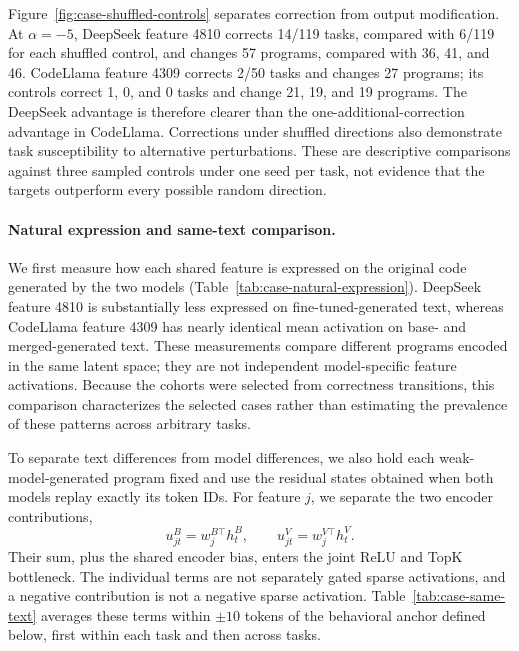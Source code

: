 Figure~\ref{fig:case-shuffled-controls} separates correction from output modification. At $\alpha=-5$, DeepSeek feature 4810 corrects 14/119 tasks, compared with 6/119 for each shuffled control, and changes 57 programs, compared with 36, 41, and 46. CodeLlama feature 4309 corrects 2/50 tasks and changes 27 programs; its controls correct 1, 0, and 0 tasks and change 21, 19, and 19 programs. The DeepSeek advantage is therefore clearer than the one-additional-correction advantage in CodeLlama. Corrections under shuffled directions also demonstrate task susceptibility to alternative perturbations. These are descriptive comparisons against three sampled controls under one seed per task, not evidence that the targets outperform every possible random direction.

\paragraph{Natural expression and same-text comparison.}
We first measure how each shared feature is expressed on the original code generated by the two models (Table~\ref{tab:case-natural-expression}). DeepSeek feature 4810 is substantially less expressed on fine-tuned-generated text, whereas CodeLlama feature 4309 has nearly identical mean activation on base- and merged-generated text. These measurements compare different programs encoded in the same latent space; they are not independent model-specific feature activations. Because the cohorts were selected from correctness transitions, this comparison characterizes the selected cases rather than estimating the prevalence of these patterns across arbitrary tasks.



To separate text differences from model differences, we also hold each weak-model-generated program fixed and use the residual states obtained when both models replay exactly its token IDs. For feature $j$, we separate the two encoder contributions,
\[
 u_{jt}^{B}=w_{j}^{B\top}h_t^{B},\qquad
 u_{jt}^{V}=w_{j}^{V\top}h_t^{V}.
\]
Their sum, plus the shared encoder bias, enters the joint ReLU and TopK bottleneck. The individual terms are not separately gated sparse activations, and a negative contribution is not a negative sparse activation. Table~\ref{tab:case-same-text} averages these terms within $\pm10$ tokens of the behavioral anchor defined below, first within each task and then across tasks.



